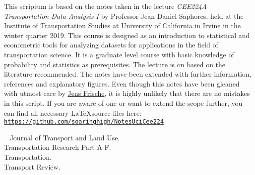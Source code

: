 \maketitle
\tableofcontents
{}
This scriptum is based on the notes taken in the lecture \emph{CEE224A Transportation Data Analysis I} by Professor Jean-Daniel Saphores, held at the Institute of Transportation Studies at University of California in Irvine in the winter quarter 2019. This course is designed as an introduction to statistical and econometric tools for analyzing datasets for applications in the field of transportation science. It is a graduate level course with basic knowledge of probability and statistics as prerequisites. The lecture is on based on the literature recommended. The notes have been extended with further information, references and explanatory figures. Even though this notes have been gleaned with utmost care by  \href{mailto:jfrische@uci.edu}{Jens Frische}, it is highly unlikely that there are no mistakes in this script. If you are aware of one or want to extend the scope further, you can find all necessary \LaTeX\space source files here: \href{https://github.com/soaringhigh/NotesUciCee224}{\texttt{https://github.com/soaringhigh/NotesUciCee224}}\nocite{Washington.2011}\nocite{Angrist.2009}\nocite{Stock.2015}\nocite{Kennedy.2008}\nocite{Wooldridge.2016}\nocite{Train.2009}\nocite{Conover.1999}

\doclicenseThis

\printbibliography[title={Recommended Literature}]\
		Journal of Transport and Land Use.\\
		Transportation Research Part A-F.\\
		Transportation.\\
		Transport Review.